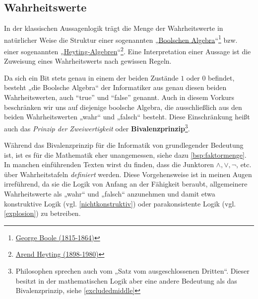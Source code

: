 \subsection*{Wahrheitswerte}


\begin{vorschau}[Bivalenzprinzip] \label{bivalenz} 
    In der klassischen Aussagenlogik trägt die Menge der Wahrheitswerte in natürlicher Weise die Struktur einer sogenannten „\href{https://en.wikipedia.org/wiki/Boolean_algebra_(structure)}{Boolschen Algebra}“\footnote{\href{https://de.wikipedia.org/wiki/George_Boole}{George Boole (1815-1864)}} bzw. einer sogenannten „\href{https://ncatlab.org/nlab/show/Heyting+algebra}{Heyting-Algebren}“\footnote{\href{https://de.wikipedia.org/wiki/Arend_Heyting}{Arend Heyting (1898-1980)}}. Eine Interpretation einer Aussage ist die Zuweisung eines Wahrheitswerts nach gewissen Regeln. 
    
    Da sich ein Bit stets genau in einem der beiden Zustände $1$ oder $0$ befindet, besteht „die Boolsche Algebra“ der Informatiker aus genau diesen beiden Wahrheitswerten, auch ``true'' und ``false'' genannt. Auch in diesem Vorkurs beschränken wir uns auf diejenige boolsche Algebra, die ausschließlich aus den beiden Wahrheitswerten „wahr“ und „falsch“ besteht. Diese Einschränkung heißt auch das \emph{Prinzip der Zweiwertigkeit} oder \textbf{Bivalenzprinzip}\footnote{Philosophen sprechen auch vom „Satz vom ausgeschlossenen Dritten“. Dieser besitzt in der mathematischen Logik aber eine andere Bedeutung als das Bivalenzprinzip, siehe \cref{excludedmiddle}}.
    
    Während das Bivalenzprinzip für die Informatik von grundlegender Bedeutung ist, ist es für die Mathematik eher unangemessen, siehe dazu \cref{bsp:faktormenge}. In manchen einführenden Texten wirst du finden, dass die Junktoren $\land,\lor,\neg$, etc. über Wahrheitstafeln \emph{definiert} werden. Diese Vorgehensweise ist in meinen Augen irreführend, da sie die Logik von Anfang an der Fähigkeit beraubt, allgemeinere Wahrheitswerte als „wahr“ und „falsch“ anzunehmen und damit etwa konstruktive Logik (vgl. \cref{nichtkonstruktiv}) oder parakonsistente Logik (vgl. \cref{explosion}) zu betreiben.
\end{vorschau}


\begin{comment}
\begin{bem}[* „Konstante“ Aussagen]
    In der Aussagenlogik kann es bequem sein, Aussagezeichen einzuführen, die für eine Aussage stehen, die stets wahr oder stets falsch sein sollen:
    \begin{itemize}
        \item Mit „$\top$“ (wie englisch ``true'') ist eine Aussage gemeint, die in einem absoluten Sinn immer wahr sein soll.
        \item Mit „$\bot$“ ist eine Aussage gemeint, die in einem absoluten Sinn falsch sein soll, unabhängig davon, wie sie interpretiert wird.
    \end{itemize}
\end{bem}
\end{comment}
 

